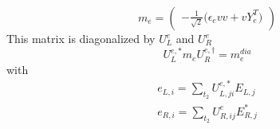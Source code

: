 \begin{itemize}
\begin{equation} 
m_{e} = \left( 
\begin{array}{c}
- \frac{1}{\sqrt{2}} \Big(\epsilon_e vv  + v Y_{e}^{T} \Big)\end{array} 
\right) 
 \end{equation} 
This matrix is diagonalized by \(U^e_L\) and \(U^e_R\) 
\begin{equation} 
U^{e,*}_L m_{e} U_{R}^{e,\dagger} = m^{dia}_{e} 
\end{equation} 
with 
\begin{align} 
e_{L,{i}} = \sum_{t_2}U^{e,*}_{L,{j i}}E_{L,{j}}\\ 
e_{R,{i}} = \sum_{t_2}U_{R,{i j}}^{e}E^*_{R,{j}}
\end{align} 
\end{itemize} 
